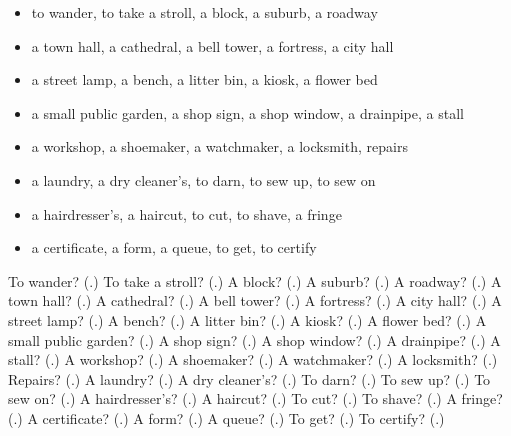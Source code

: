 \begin{itemize}
\raggedright
  \item to wander, to take a stroll, a block, a suburb, a roadway
  \item a town hall, a cathedral, a bell tower, a fortress, a city hall
  \item a street lamp, a bench, a litter bin, a kiosk, a flower bed
  \item a small public garden, a shop sign, a shop window, a drainpipe, a stall
  \item a workshop, a shoemaker, a watchmaker, a locksmith, repairs
  \item a laundry, a dry cleaner's, to darn, to sew up, to sew on
  \item a hairdresser's, a haircut, to cut, to shave, a fringe
  \item a certificate, a form, a queue, to get, to certify
\end{itemize}

\begin{tcolorbox}[breakable,colback=teal!4,colframe=teal!35!black,title={Before you move on}]
To wander? (\textbf{}.) To take a stroll? (\textbf{}.) A block? (\textbf{}.) A suburb? (\textbf{}.) A roadway? (\textbf{}.) A town hall? (\textbf{}.) A cathedral? (\textbf{}.) A bell tower? (\textbf{}.) A fortress? (\textbf{}.) A city hall? (\textbf{}.) A street lamp? (\textbf{}.) A bench? (\textbf{}.) A litter bin? (\textbf{}.) A kiosk? (\textbf{}.) A flower bed? (\textbf{}.) A small public garden? (\textbf{}.) A shop sign? (\textbf{}.) A shop window? (\textbf{}.) A drainpipe? (\textbf{}.) A stall? (\textbf{}.) A workshop? (\textbf{}.) A shoemaker? (\textbf{}.) A watchmaker? (\textbf{}.) A locksmith? (\textbf{}.) Repairs? (\textbf{}.) A laundry? (\textbf{}.) A dry cleaner's? (\textbf{}.) To darn? (\textbf{}.) To sew up? (\textbf{}.) To sew on? (\textbf{}.) A hairdresser's? (\textbf{}.) A haircut? (\textbf{}.) To cut? (\textbf{}.) To shave? (\textbf{}.) A fringe? (\textbf{}.) A certificate? (\textbf{}.) A form? (\textbf{}.) A queue? (\textbf{}.) To get? (\textbf{}.) To certify? (\textbf{}.)
\end{tcolorbox}
